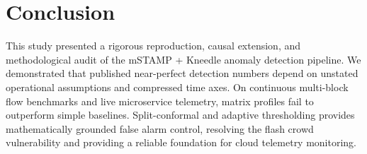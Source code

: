 \documentclass[10pt,twocolumn]{article}
\begin{document}
\newpage

\section{Conclusion}
This study presented a rigorous reproduction, causal extension, and methodological audit of the mSTAMP + Kneedle anomaly detection pipeline. We demonstrated that published near-perfect detection numbers depend on unstated operational assumptions and compressed time axes. On continuous multi-block flow benchmarks and live microservice telemetry, matrix profiles fail to outperform simple baselines. Split-conformal and adaptive thresholding provides mathematically grounded false alarm control, resolving the flash crowd vulnerability and providing a reliable foundation for cloud telemetry monitoring.

\clearpage
\onecolumn

\renewcommand{\refname}{\centering\LARGE References}

\begin{center}
\begin{minipage}{0.88\textwidth}


\end{minipage}
\end{center}
\end{document}
